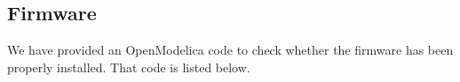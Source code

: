 

\subsection{Firmware}
\lstset{style=mystyle}
\label{sec:test-firmware-OpenModelica}
We have provided an OpenModelica code to check whether the firmware has been
properly installed.  That code is listed below.

\begin{OpenModelicacode}
      \label{OpenModelica:test-firmware}
      
\end{OpenModelicacode}

